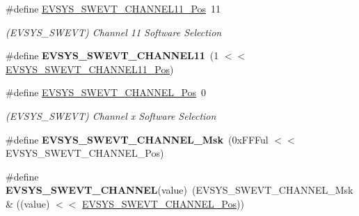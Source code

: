 \begin{DoxyCompactItemize}
\item 
\hypertarget{group___s_a_m_l21___e_v_s_y_s_ga8054acc441c110d0108ec677b4d1dd66}{}\#define \hyperlink{group___s_a_m_l21___e_v_s_y_s_ga8054acc441c110d0108ec677b4d1dd66}{E\+V\+S\+Y\+S\+\_\+\+S\+W\+E\+V\+T\+\_\+\+C\+H\+A\+N\+N\+E\+L11\+\_\+\+Pos}~11\label{group___s_a_m_l21___e_v_s_y_s_ga8054acc441c110d0108ec677b4d1dd66}

\begin{DoxyCompactList}\small\item\em (E\+V\+S\+Y\+S\+\_\+\+S\+W\+E\+V\+T) Channel 11 Software Selection \end{DoxyCompactList}\item 
\hypertarget{group___s_a_m_l21___e_v_s_y_s_ga40e42c01f976f9826600600cb83d9b21}{}\#define {\bfseries E\+V\+S\+Y\+S\+\_\+\+S\+W\+E\+V\+T\+\_\+\+C\+H\+A\+N\+N\+E\+L11}~(1 $<$$<$ \hyperlink{group___s_a_m_l21___e_v_s_y_s_ga8054acc441c110d0108ec677b4d1dd66}{E\+V\+S\+Y\+S\+\_\+\+S\+W\+E\+V\+T\+\_\+\+C\+H\+A\+N\+N\+E\+L11\+\_\+\+Pos})\label{group___s_a_m_l21___e_v_s_y_s_ga40e42c01f976f9826600600cb83d9b21}

\item 
\hypertarget{group___s_a_m_l21___e_v_s_y_s_gade0f8631c02c7cd2c5ea987d87f97a53}{}\#define \hyperlink{group___s_a_m_l21___e_v_s_y_s_gade0f8631c02c7cd2c5ea987d87f97a53}{E\+V\+S\+Y\+S\+\_\+\+S\+W\+E\+V\+T\+\_\+\+C\+H\+A\+N\+N\+E\+L\+\_\+\+Pos}~0\label{group___s_a_m_l21___e_v_s_y_s_gade0f8631c02c7cd2c5ea987d87f97a53}

\begin{DoxyCompactList}\small\item\em (E\+V\+S\+Y\+S\+\_\+\+S\+W\+E\+V\+T) Channel x Software Selection \end{DoxyCompactList}\item 
\hypertarget{group___s_a_m_l21___e_v_s_y_s_gaa255405f7948ee8c7571c4bb942c915a}{}\#define {\bfseries E\+V\+S\+Y\+S\+\_\+\+S\+W\+E\+V\+T\+\_\+\+C\+H\+A\+N\+N\+E\+L\+\_\+\+Msk}~(0x\+F\+F\+Ful $<$$<$ E\+V\+S\+Y\+S\+\_\+\+S\+W\+E\+V\+T\+\_\+\+C\+H\+A\+N\+N\+E\+L\+\_\+\+Pos)\label{group___s_a_m_l21___e_v_s_y_s_gaa255405f7948ee8c7571c4bb942c915a}

\item 
\hypertarget{group___s_a_m_l21___e_v_s_y_s_gafc845bd28ea7265783595e6fe5cd17a3}{}\#define {\bfseries E\+V\+S\+Y\+S\+\_\+\+S\+W\+E\+V\+T\+\_\+\+C\+H\+A\+N\+N\+E\+L}(value)~(E\+V\+S\+Y\+S\+\_\+\+S\+W\+E\+V\+T\+\_\+\+C\+H\+A\+N\+N\+E\+L\+\_\+\+Msk \& ((value) $<$$<$ \hyperlink{group___s_a_m_l21___e_v_s_y_s_gade0f8631c02c7cd2c5ea987d87f97a53}{E\+V\+S\+Y\+S\+\_\+\+S\+W\+E\+V\+T\+\_\+\+C\+H\+A\+N\+N\+E\+L\+\_\+\+Pos}))\label{group___s_a_m_l21___e_v_s_y_s_gafc845bd28ea7265783595e6fe5cd17a3}


\end{DoxyCompactItemize}
